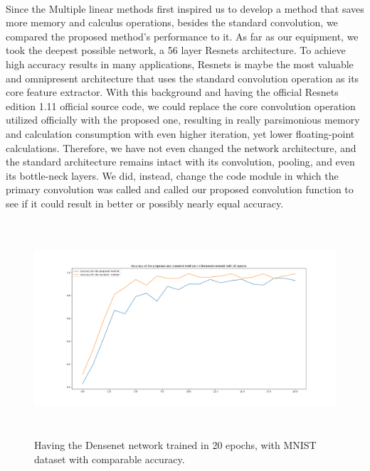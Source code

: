 \documentclass{report}
\begin{document}
\paragraph*{}
Since the Multiple linear methods first inspired us to develop a method that saves more memory and calculus operations, besides the standard convolution, we compared the proposed method's performance to it. As far as our equipment, we took the deepest possible network, a 56 layer Resnets architecture. To achieve high accuracy results in many applications, Resnets is maybe the most valuable and omnipresent architecture that uses the standard convolution operation as its core feature extractor. With this background and having the official Resnets edition 1.11 official source code, we could replace the core convolution operation utilized officially with the proposed one, resulting in really parsimonious memory and calculation consumption with even higher iteration, yet lower floating-point calculations. Therefore, we have not even changed the network architecture, and the standard architecture remains intact with its convolution, pooling, and even its bottle-neck layers. We did, instead, change the code module in which the primary convolution was called and called our proposed convolution function to see if it could result in better or possibly nearly equal accuracy. 



\begin{figure}[h!]
	\begin{center}
		\includegraphics[height=8cm]{Densenet_accuracy_mnist.png}
	\end{center}
	\label{mnistacc}
	\caption{Having the Densenet network trained in 20 epochs, with MNIST dataset with comparable accuracy.
}
\end{figure}
\end{document}
